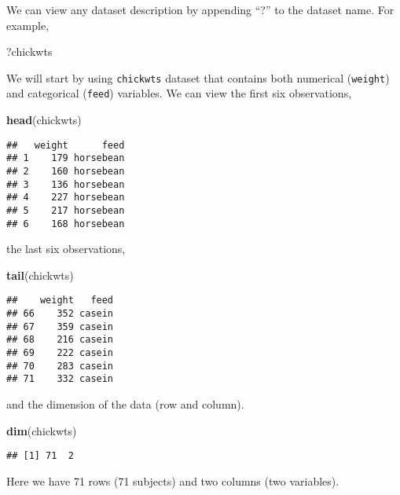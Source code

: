 \documentclass[]{book}
\newenvironment{Shaded}{\begin{snugshade}}{\end{snugshade}}
\newcommand{\KeywordTok}[1]{\textcolor[rgb]{0.13,0.29,0.53}{\textbf{{#1}}}}
\newcommand{\NormalTok}[1]{{#1}}
\theoremstyle{definition}
\theoremstyle{definition}
\theoremstyle{remark}
\begin{document}
We can view any dataset description by appending ``?'' to the dataset
name. For example,

\begin{Shaded}
\begin{Highlighting}[]
\NormalTok{?chickwts}
\end{Highlighting}
\end{Shaded}

We will start by using \texttt{chickwts} dataset that contains both
numerical (\texttt{weight}) and categorical (\texttt{feed}) variables.
We can view the first six observations,

\begin{Shaded}
\begin{Highlighting}[]
\KeywordTok{head}\NormalTok{(chickwts)}
\end{Highlighting}
\end{Shaded}

\begin{verbatim}
##   weight      feed
## 1    179 horsebean
## 2    160 horsebean
## 3    136 horsebean
## 4    227 horsebean
## 5    217 horsebean
## 6    168 horsebean
\end{verbatim}

the last six observations,

\begin{Shaded}
\begin{Highlighting}[]
\KeywordTok{tail}\NormalTok{(chickwts)}
\end{Highlighting}
\end{Shaded}

\begin{verbatim}
##    weight   feed
## 66    352 casein
## 67    359 casein
## 68    216 casein
## 69    222 casein
## 70    283 casein
## 71    332 casein
\end{verbatim}

and the dimension of the data (row and column).

\begin{Shaded}
\begin{Highlighting}[]
\KeywordTok{dim}\NormalTok{(chickwts)}
\end{Highlighting}
\end{Shaded}

\begin{verbatim}
## [1] 71  2
\end{verbatim}

Here we have 71 rows (71 subjects) and two columns (two variables).
\end{document}

